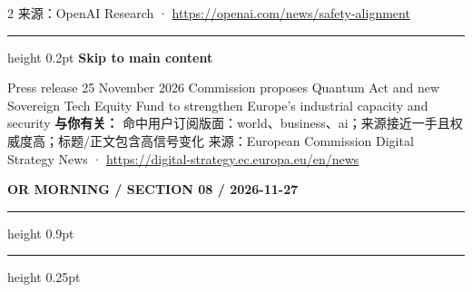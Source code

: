 \documentclass[10.5pt]{ctexart}
\begin{document}
\begin{multicols}{2}
{\footnotesize\color{ormuted} 来源：OpenAI Research · \url{https://openai.com/news/safety-alignment}}
\vspace{2mm}
\hrule height 0.2pt
\vspace{2mm}
{\large\bfseries Skip to main content}\par
Press release 25 November 2026 Commission proposes Quantum Act and new Sovereign Tech Equity Fund to strengthen Europe's industrial capacity and security
\textbf{与你有关：} 命中用户订阅版面：world、business、ai；来源接近一手且权威度高；标题/正文包含高信号变化
{\footnotesize\color{ormuted} 来源：European Commission Digital Strategy News · \url{https://digital-strategy.ec.europa.eu/en/news}}
\end{multicols}
\newpage
{\small\bfseries OR MORNING / SECTION 08 / 2026-11-27}
\vspace{2mm}
\hrule height 0.9pt
\vspace{1.5mm}
\hrule height 0.25pt
\vspace{4mm}
\end{document}
